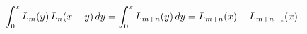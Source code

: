 \[\int_{0}^{x}\mathop{L_{m}\/}\nolimits\!\left(y\right)\mathop{L_{n}\/}\nolimits%
\!\left(x-y\right)dy=\int_{0}^{x}\mathop{L_{m+n}\/}\nolimits\!\left(y\right)dy%
=\mathop{L_{m+n}\/}\nolimits\!\left(x\right)-\mathop{L_{m+n+1}\/}\nolimits\!%
\left(x\right).\]